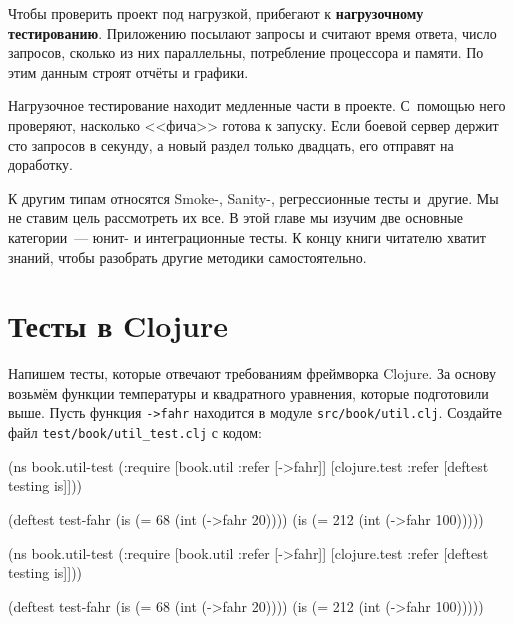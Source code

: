 Чтобы проверить проект под нагрузкой, прибегают к \textbf{нагрузочному тестированию}.
Приложению посылают запросы и считают время ответа, число запросов, сколько
из них параллельны, потребление процессора и памяти. По этим данным строят
отчёты и графики.


Нагрузочное тестирование находит медленные части в проекте. С~помощью него
проверяют, насколько <<фича>> готова к запуску. Если боевой сервер держит сто
запросов в секунду, а новый раздел только двадцать, его отправят на доработку.

К другим типам относятся Smoke-, Sanity-, регрессионные тесты и~другие. Мы не
ставим цель рассмотреть их все. В этой главе мы изучим две основные
категории~--- юнит- и интеграционные тесты. К концу книги читателю хватит
знаний, чтобы разобрать другие методики самостоятельно.

\section{Тесты в Clojure}

Напишем тесты, которые отвечают требованиям фреймворка Clojure. За основу
возьмём функции температуры и квадратного уравнения, которые подготовили
выше. Пусть функция \verb|->fahr| находится в модуле
\texttt{src/book/util\-.clj}. Создайте файл \verb|test/book/util_test.clj| с кодом:


\ifx\DEVICETYPE\MOBILE

\begin{english}
  \begin{clojure}
(ns book.util-test
  (:require
   [book.util :refer [->fahr]]
   [clojure.test :refer
    [deftest testing is]]))

(deftest test-fahr
  (is (= 68 (int (->fahr 20))))
  (is (= 212 (int (->fahr 100)))))
  \end{clojure}
\end{english}

\else

\begin{english}
  \begin{clojure}
(ns book.util-test
  (:require
    [book.util :refer [->fahr]]
    [clojure.test :refer [deftest testing is]]))

(deftest test-fahr
  (is (= 68 (int (->fahr 20))))
  (is (= 212 (int (->fahr 100)))))
  \end{clojure}
\end{english}

